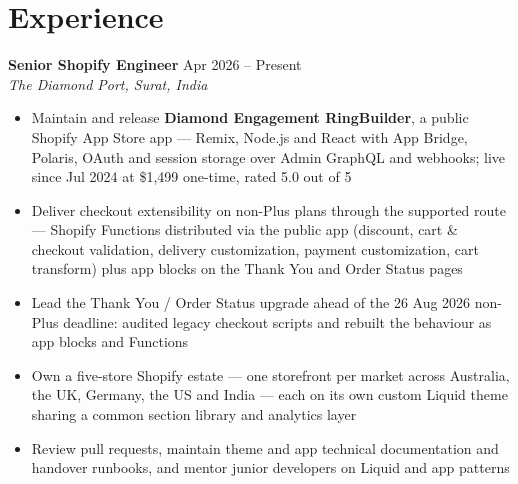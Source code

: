 \documentclass[10pt]{article}
\begin{document}
\section*{Experience}

\textbf{Senior Shopify Engineer} \hfill Apr 2026 -- Present \\
\textit{The Diamond Port, Surat, India}
\begin{itemize}
  \item Maintain and release \textbf{Diamond Engagement RingBuilder}, a public Shopify App Store app --- Remix, Node.js and React with App Bridge, Polaris, OAuth and session storage over Admin GraphQL and webhooks; live since Jul 2024 at \$1{,}499 one-time, rated 5.0 out of 5
  \item Deliver checkout extensibility on non-Plus plans through the supported route --- Shopify Functions distributed via the public app (discount, cart \& checkout validation, delivery customization, payment customization, cart transform) plus app blocks on the Thank You and Order Status pages
  \item Lead the Thank You / Order Status upgrade ahead of the 26 Aug 2026 non-Plus deadline: audited legacy checkout scripts and rebuilt the behaviour as app blocks and Functions
  \item Own a five-store Shopify estate --- one storefront per market across Australia, the UK, Germany, the US and India --- each on its own custom Liquid theme sharing a common section library and analytics layer
  \item Review pull requests, maintain theme and app technical documentation and handover runbooks, and mentor junior developers on Liquid and app patterns %
\end{itemize}

\vspace{1pt}
\end{document}
